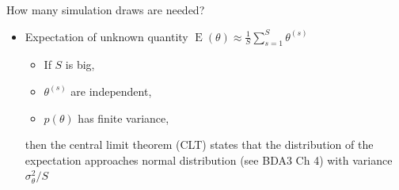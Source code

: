 \documentclass[english,t]{beamer}
\DeclareMathOperator{\E}{E}
\begin{document}
\begin{frame}{How many simulation draws are needed?}

  \vspace{-0.7\baselineskip}
  \begin{itemize}
  \item Expectation of unknown quantity $\E(\theta)\approx \frac{1}{S}\sum_{s=1}^S \theta^{(s)}$
    \begin{itemize}
    \item If $S$ is big,
    \item $\theta^{(s)}$ are independent,  
    \item $p(\theta)$ has finite variance,
    \end{itemize}
    then the central limit theorem (CLT) states
    that the distribution of the expectation approaches normal
    distribution (see BDA3 Ch 4) with variance $\sigma^2_\theta/S$

\end{itemize}
\end{frame}
\end{document}

